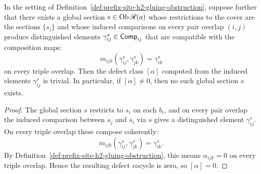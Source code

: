 \begin{proposition}
\label{prop:null-as-h2-obstruction}
In the setting of Definition~\ref{def:prefix-site-h2-gluing-obstruction},
suppose further that there exists a global section $s\in\operatorname{Ob}\mathscr{R}(a)$ whose
restrictions to the cover are the sections $\{s_i\}$ and whose induced
comparisons on every pair overlap $(i,j)$ produce distinguished elements
$\gamma_{ij}^s\in\mathsf{Comp}_{ij}$ that are compatible with the composition maps:
\[
m_{ijk}(\gamma_{ij}^s,\gamma_{jk}^s)=\gamma_{ik}^s
\]
on every triple overlap.  Then the defect class $[\alpha]$ computed from the
induced elements $\gamma^s_{ij}$ is trivial.  In particular, if
$[\alpha]\neq 0$, then no such global section $s$ exists.
\end{proposition}

\begin{proof}
The global section $s$ restricts to $s_i$ on each $b_i$, and on every pair
overlap the induced comparison between $s_j$ and $s_i$ via $s$ gives a
distinguished element $\gamma_{ij}^s$.  On every triple overlap these compose
coherently:
\[
m_{ijk}(\gamma_{ij}^s,\gamma_{jk}^s)=\gamma_{ik}^s.
\]
By Definition~\ref{def:prefix-site-h2-gluing-obstruction}, this means
$\alpha_{ijk}=0$ on every triple overlap.  Hence the resulting defect cocycle
is zero, so $[\alpha]=0$.
\end{proof}

